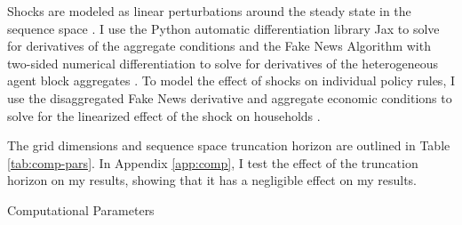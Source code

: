 Shocks are modeled as linear perturbations around the steady state in the sequence space \autocite{auclert2021using}. I use the Python automatic differentiation library Jax to solve for derivatives of the aggregate conditions and the Fake News Algorithm with two-sided numerical differentiation to solve for derivatives of the heterogeneous agent block aggregates \autocites{auclert2021using}. To model the effect of shocks on individual policy rules, I use the disaggregated Fake News derivative and aggregate economic conditions to solve for the linearized effect of the shock on households \autocites{auclert2021using}.

The grid dimensions and sequence space truncation horizon are outlined in Table \ref{tab:comp-pars}. In Appendix \ref{app:comp}, I test the effect of the truncation horizon on my results, showing that it has a negligible effect on my results.

\begin{table}[t]
    \centering
    \caption{Computational Parameters}
    
    \label{tab:comp-pars}
\end{table}
